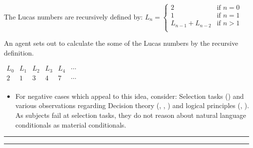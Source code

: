 \documentclass[10pt]{article}
\newcommand\sepLine{
  \vfill
  \par\noindent\rule{\textwidth}{0.4pt}%
  \vspace{-10pt}%
  \par\noindent\rule{\textwidth}{0.4pt}
  \vfill}
\newcommand{\hand}{\ding{43}}
\begin{document}
\begin{note}
    \begin{scenario}%
    \label{scen:LucasNums}%
    The Lucas numbers are recursively defined by: \qquad
    \(
      L_{n} = \left\{
        \begin{array}{ll}
          2 & \text{if } n = 0 \\
          1 & \text{if } n = 1 \\
          L_{n-1} + L_{n-2} & \text{if } n > 1 \\
        \end{array}
      \right.
    \)

    \smallskip
    \noindent An agent sets out to calculate the some of the Lucas numbers by the recursive definition.
    \begin{center}
      \(
      \begin{array}{cccccc}
        L_{0} & L_{1} & L_{2} & L_{3} & L_{4} & \cdots \\
        \hline
        2 & 1 & 3 & 4 & 7 & \cdots \\
      \end{array}
      \)
    \end{center}
    \vspace{-2\baselineskip}
  \end{scenario}

  \begin{itemize}
  \item[\hand]
    For negative cases which appeal to this idea, consider:
    Selection tasks (\cite{Wason:1966aa}) and various observations regarding Decision theory (\cite{Allais:1979aa}, \cite{Ellsberg:1961aa}, \cite{Quinn:1990aa}) and logical principles (\cite{Makinson:1965aa}, \cite{Kyburg:1997aa}).\newline
    \mbox{}\hfill \leadsto As subjects fail at selection tasks, they do not reason about natural language conditionals as material conditionals.
  \end{itemize}
\end{note}

\sepLine
\end{document}
